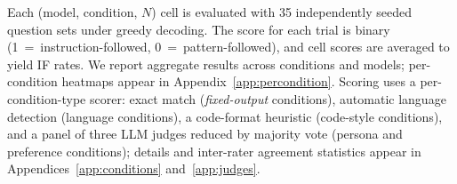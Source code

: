 Each (model, condition, $N$) cell is evaluated with 35 independently seeded question sets under greedy decoding. The score for each trial is binary (1~=~instruction-followed, 0~=~pattern-followed), and cell scores are averaged to yield IF rates. We report aggregate results across conditions and models; per-condition heatmaps appear in Appendix~\ref{app:percondition}. Scoring uses a per-condition-type scorer: exact match (\emph{fixed-output} conditions), automatic language detection (language conditions), a code-format heuristic (code-style conditions), and a panel of three LLM judges reduced by majority vote (persona and preference conditions); details and inter-rater agreement statistics appear in Appendices~\ref{app:conditions} and~\ref{app:judges}.
